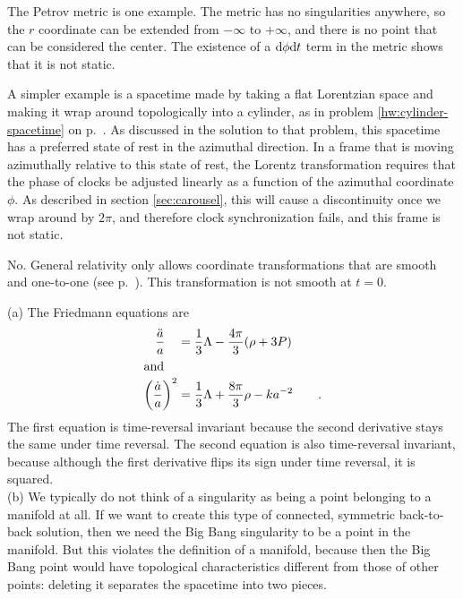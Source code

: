 
The Petrov metric is one example. The metric has no singularities anywhere, so the $r$ coordinate
can be extended from $-\infty$ to $+\infty$, and there is no point that can be considered the center.
The existence of a $\textup{d}\phi \textup{d} t$ term in the metric shows that it is not static.

A simpler example is a spacetime made by taking a flat Lorentzian space and making it wrap around topologically
into a cylinder, as in problem \ref{hw:cylinder-spacetime} on p.~\pageref{hw:cylinder-spacetime}. As discussed
in the solution to that problem, this spacetime has a preferred state of rest in the azimuthal direction.
In a frame that is moving azimuthally relative to this state of rest, the Lorentz transformation requires that
the phase of clocks be adjusted linearly as a function of the azimuthal coordinate $\phi$. As described
in section \ref{sec:carousel}, this will cause a discontinuity once we wrap around by $2\pi$, and therefore
clock synchronization fails, and this frame is not static.


No. General relativity only allows coordinate transformations that are smooth and one-to-one (see p.~\pageref{diffeomorphism}).
This transformation is not smooth at $t=0$.

(a) The Friedmann equations are
\begin{align*}
  \frac{\ddot{a}}{a}   \quad          &= \frac{1}{3}\Lambda - \frac{4\pi}{3}(\rho+3P) \\
\intertext{and}
  \left(\frac{\dot{a}}{a}\right)^2    &= \frac{1}{3}\Lambda + \frac{8\pi}{3}\rho-k a^{-2} \qquad .
\end{align*}
The first equation is time-reversal invariant because the second derivative stays the same under time reversal.
The second equation is also time-reversal invariant, because although the first derivative flips its sign
under time reversal, it is squared.\\
(b) We typically do not think of a singularity as being a point belonging to a manifold at all. If we want to
create this type of connected, symmetric back-to-back solution, then we need the Big Bang singularity to be
a point in the manifold. But this violates the definition of a manifold, because then the Big Bang point would
have topological characteristics different from those of other points: deleting it separates the spacetime into
two pieces.


